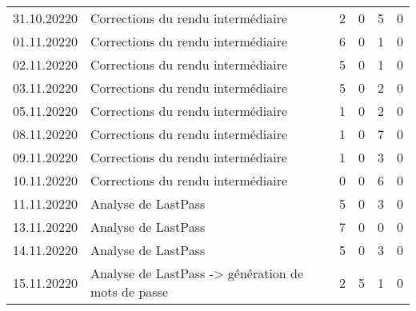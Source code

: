 \begin{landscape}
\begin{longtable}[c]{lp{10cm}rrrr}
		31.10.20220
	& Corrections du rendu intermédiaire
	& 2 %
	& 0 %
	& 5 %
	& 0\\ %
	
		01.11.20220
	& Corrections du rendu intermédiaire
	& 6 %
	& 0 %
	& 1 %
	& 0\\ %
	
	02.11.20220
	& Corrections du rendu intermédiaire
	& 5 %
	& 0 %
	& 1 %
	& 0\\ %
	
	03.11.20220
	& Corrections du rendu intermédiaire
	& 5 %
	& 0 %
	& 2 %
	& 0\\ %
	
	05.11.20220
	& Corrections du rendu intermédiaire
	& 1 %
	& 0 %
	& 2 %
	& 0\\ %
	
	08.11.20220
	& Corrections du rendu intermédiaire
	& 1 %
	& 0 %
	& 7 %
	& 0\\ %
	
	09.11.20220
	& Corrections du rendu intermédiaire
	& 1 %
	& 0 %
	& 3 %
	& 0\\ %
	
	10.11.20220
	& Corrections du rendu intermédiaire
	& 0 %
	& 0 %
	& 6 %
	& 0\\ %
	
	11.11.20220
	& Analyse de LastPass
	& 5 %
	& 0 %
	& 3 %
	& 0\\ %
	
	13.11.20220
	& Analyse de LastPass
	& 7 %
	& 0 %
	& 0 %
	& 0\\ %
	
	14.11.20220
	& Analyse de LastPass
	& 5 %
	& 0 %
	& 3 %
	& 0\\ %
	
	15.11.20220
	& Analyse de LastPass -> génération de mots de passe
	& 2 %
	& 5 %
	& 1 %
	& 0\\ %
	
\end{longtable}


\end{landscape}
